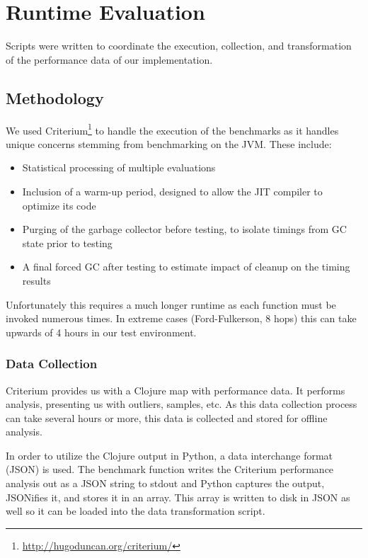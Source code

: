 	\section{Runtime Evaluation}
	\label{sec:runtime-evaluation}
		Scripts were written to coordinate the execution, collection, and transformation of the performance data of our implementation.
		
		\subsection{Methodology}
			We used Criterium\footnote{\url{http://hugoduncan.org/criterium/}} to handle the execution of the benchmarks as it handles unique concerns stemming from benchmarking on the JVM.  These include:
			
			\begin{itemize}
				\item Statistical processing of multiple evaluations
				\item Inclusion of a warm-up period, designed to allow the JIT compiler to optimize its code
				\item Purging of the garbage collector before testing, to isolate timings from GC state prior to testing
				\item A final forced GC after testing to estimate impact of cleanup on the timing results
			\end{itemize}
		
			Unfortunately this requires a much longer runtime as each function must be invoked numerous times.	In extreme cases (Ford-Fulkerson, 8 hops) this can take upwards of 4 hours in our test environment.
		
			\subsubsection{Data Collection}
			\label{sec:data-collection}
				Criterium provides us with a Clojure map with performance data.	 It performs analysis, presenting us with outliers, samples, etc.  As this data collection process can take several hours or more, this data is collected and stored for offline analysis.
				
				In order to utilize the Clojure output in Python, a data interchange format (JSON) is used.	 The benchmark function writes the Criterium performance analysis out as a JSON string to stdout and Python captures the output, JSONifies it, and stores it in an array.  This array is written to disk in JSON as well so it can be loaded into the data transformation script.
				
